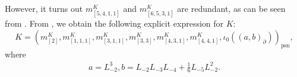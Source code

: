 \documentclass[12pt, a4paper]{article}
\theoremstyle{remark}
\DeclareMathOperator{\psn}{psn}
\begin{document}
However, it turns out $m^K_{[5, 4, 1, 1]}$ and $m^K_{[6, 5, 3, 1]}$ are redundant, as can be seen from \cite[m11-m15.ipynb]{sagemath2}.
From \cite[Theorem 2]{andrews_singular_2022}, we obtain the following explicit expression for $K$:
\begin{equation*}
  K = (m^K_{[2]}, m^K_{[1, 1, 1]}, m^K_{[3, 1, 1]}, m^K_{[3, 3]}, m^K_{[4, 3, 1]}, m^K_{[4, 4, 1]}, \iota_0((a, b)_\partial))_{\psn},
\end{equation*}
where
\begin{align*}
  a = L_{-2}^3, b = L_{-2}L_{-3}L_{-4} + \tfrac{1}{6}L_{-5}L_{-2}^2.
\end{align*}



\end{document}
